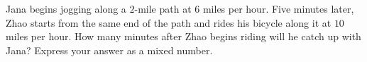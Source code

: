 Jana begins jogging along a $2$-mile path at $6$ miles per hour. Five minutes later, Zhao starts from the same end of the path and rides his bicycle along it at $10$ miles per hour. How many minutes after Zhao begins riding will he catch up with Jana? Express your answer as a mixed number.
